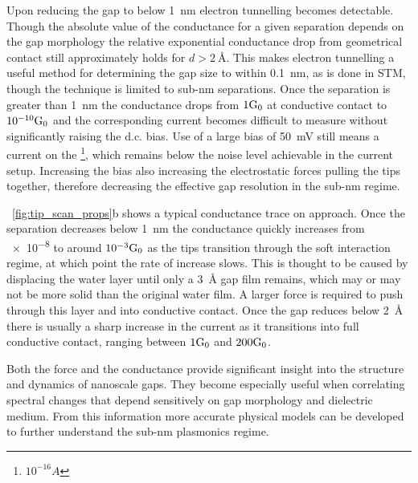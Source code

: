 \documentclass[a4paper]{article}
\begin{document}
Upon reducing the gap to below \SI{1}{nm} electron tunnelling becomes detectable. Though the absolute value of the conductance for a given separation depends on the gap morphology the relative exponential conductance drop from geometrical contact still approximately holds for $d>\SI{2}{\angstrom} $\cite{esteban2014classical}. This makes electron tunnelling a useful method for determining the gap size to within \SI{0.1}{nm}, as is done in STM, though the technique is limited to sub-nm separations. Once the separation is greater than \SI{1}{nm} the conductance drops from $1\mathrm{G_{0}}$ at conductive contact to $10^{-10}\mathrm{G_{0}}$ and the corresponding current becomes difficult to measure without significantly raising the d.c. bias. Use of a large bias of \SI{50}{mV} still means a current on the \footnote{$10^{-16}\si{A}$}, which remains below the noise level achievable in the current setup. Increasing the bias also increasing the electrostatic forces pulling the tips together, therefore decreasing the effective gap resolution in the sub-nm regime.

\figurename~\ref{fig:tip_scan_props}b shows a typical conductance trace on approach. Once the separation decreases below \SI{1}{nm} the conductance quickly increases from \num{e-8} to around $10^{-3}\mathrm{G_{0}}$ as the tips transition through the soft interaction regime, at which point the rate of increase slows. {\color{red}This is thought to be caused by displacing the water layer until only a \SI{3}{\angstrom} gap film remains, which may or may not be more solid than the original water film.} A larger force is required to push through this layer and into conductive contact. Once the gap reduces below \SI{2}{\angstrom} there is usually a sharp increase in the current as it transitions into full conductive contact, ranging between $1\mathrm{G_{0}}$ and $200\mathrm{G_{0}}$.


Both the force and the conductance provide significant insight into the structure and dynamics of nanoscale gaps. They become especially useful when correlating spectral changes that depend sensitively on gap morphology and dielectric medium. From this information more accurate physical models can be developed to further understand the sub-nm plasmonics regime.
\end{document}
